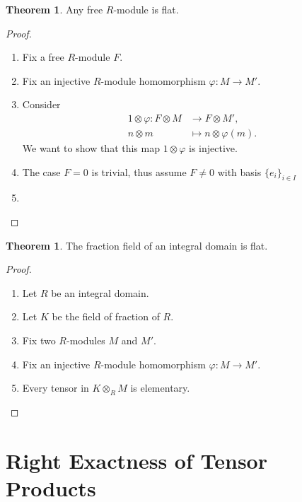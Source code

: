 \documentclass[a4paper]{book}
\theoremstyle{definition}
\newtheorem{theorem}[definition]{Theorem}
\begin{document}
\begin{thmbox}
    \begin{theorem}
        Any free \(R\)-module is flat.
    \end{theorem}
\end{thmbox}
\begin{proof}
    \begin{enumerate}
        \item Fix a free \(R\)-module \(F\).
        \item Fix an injective \(R\)-module homomorphism \(\varphi: M \rightarrow M'\).
        \item Consider \begin{align*}
            1 \otimes \varphi: F \otimes M &\rightarrow F \otimes M', \\
            n \otimes m &\mapsto n \otimes \varphi(m) \text{.}
        \end{align*}
        We want to show that this map \(1 \otimes \varphi\) is injective.
        \item The case \(F = 0\) is trivial, thus assume \(F \neq 0\) with basis \(\{e_i\}_{i \in I}\)
        \item 
    \end{enumerate}
\end{proof}

\begin{thmbox}
    \begin{theorem}
        The fraction field of an integral domain is flat.
    \end{theorem}
\end{thmbox}
\begin{proof}
    \begin{enumerate}
        \item Let \(R\) be an integral domain.
        \item Let \(K\) be the field of fraction of \(R\).
        \item Fix two \(R\)-modules \(M\) and \(M'\).
        \item Fix an injective \(R\)-module homomorphism \(\varphi: M \rightarrow M'\).
        \item Every tensor in \(K \otimes_R M\) is elementary.
    \end{enumerate}
\end{proof}


\newpage
\section{Right Exactness of Tensor Products}
\end{document}
